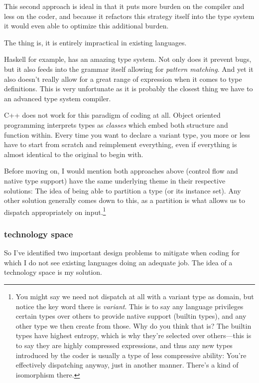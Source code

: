 \documentclass[twoside]{article}
\begin{document}
This second approach is ideal in that it puts more burden on the compiler and less on the coder, and because
it refactors this strategy itself into the type system it would even able to optimize this additional burden.

The thing is, it is entirely impractical in existing languages.

Haskell for example, has an amazing type system.  Not only does it prevent bugs, but it also feeds into the grammar
itself allowing for \emph{pattern matching}. And yet it also doesn't really allow for a great range of expression
when it comes to type definitions. This is very unfortunate as it is probably the closest thing we have to an advanced
type system compiler.

C++ does not work for this paradigm of coding at all. Object oriented programming interprets types as \emph{classes}
which embed both structure and function within. Every time you want to declare a variant type, you more or less have
to start from scratch and reimplement everything, even if everything is almost identical to the original to begin with.

Before moving on, I would mention both approaches above (control flow and native type support) have the same underlying
theme in their respective solutions: The idea of being able to partition a type (or its instance set).
Any other solution generally comes down to this, as a partition is what allows us to dispatch appropriately on
input.\footnote{You might say we need not dispatch at all with a variant type as domain, but notice the key word there
is \emph{variant}.  This is to say any language privileges certain types over others to provide native support (builtin
types), and any other type we then create from those. Why do you think that is? The builtin types have highest entropy,
which is why they're selected over others---this is to say they are highly compressed expressions, and thus any new types
introduced by the coder is usually a type of less compressive ability: You're effectively dispatching anyway,
just in another manner. There's a kind of isomorphism there.}

\subsubsection*{technology space}

So I've identified two important design problems to mitigate when coding for which I do not see existing languages doing
an adequate job. The idea of a technology space is my solution.
\end{document}
